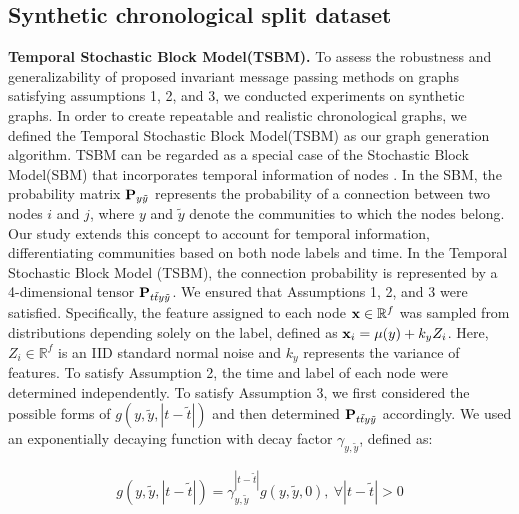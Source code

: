\subsection{Synthetic chronological split dataset}
\textbf{Temporal Stochastic Block Model(TSBM).} To assess the robustness and generalizability of proposed invariant message passing methods on graphs satisfying assumptions 1, 2, and 3, we conducted experiments on synthetic graphs. In order to create repeatable and realistic chronological graphs, we defined the Temporal Stochastic Block Model(TSBM) as our graph generation algorithm. TSBM can be regarded as a special case of the Stochastic Block Model(SBM) that incorporates temporal information of nodes \cite{holland1983stochastic,deshpande2018contextual}. In the SBM, the probability matrix $\bold{P}_{y \tilde y}$ represents the probability of a connection between two nodes $i$ and $j$, where $y$ and $\tilde y$ denote the communities to which the nodes belong. Our study extends this concept to account for temporal information, differentiating communities based on both node labels and time. In the Temporal Stochastic Block Model (TSBM), the connection probability is represented by a 4-dimensional tensor $\bold{P}_{t \tilde t y \tilde y}$. We ensured that Assumptions 1, 2, and 3 were satisfied. Specifically, the feature assigned to each node $\bold{x} \in \mathbb{R}^f$ was sampled from distributions depending solely on the label, defined as $\bold{x}_i = \mu(y) + k_{y} Z_i$. Here, $Z_i \in \mathbb{R}^f$ is an IID standard normal noise and $k_{y}$ represents the variance of features. To satisfy Assumption 2, the time and label of each node were determined independently. To satisfy Assumption 3, we first considered the possible forms of $g(y, \tilde y, |t - \tilde t|)$ and then determined $\bold{P}_{t \tilde t y \tilde y}$ accordingly. We used an exponentially decaying function with decay factor $\gamma_{y, \tilde y}$, defined as:

\vspace{-15pt}
\begin{align}
    g(y, \tilde y, |t - \tilde t|) = \gamma_{y, \tilde y}^{|t - \tilde t|} g(y , \tilde y, 0),\ \forall |t - \tilde t|>0
\end{align}
\vspace{-5pt}

